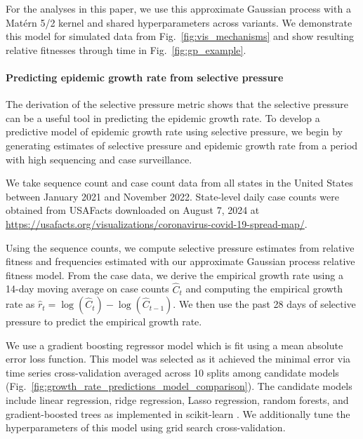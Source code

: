 \documentclass[11pt,oneside,letterpaper]{article}
\begin{document}
For the analyses in this paper, we use this approximate Gaussian process with a Mat\'ern 5/2 kernel and shared hyperparameters across variants.
We demonstrate this model for simulated data from Fig.~\ref{fig:vis_mechanisms} and show resulting relative fitnesses through time in Fig.~\ref{fig:gp_example}.

\paragraph{Predicting epidemic growth rate from selective pressure}

The derivation of the selective pressure metric shows that the selective pressure can be a useful tool in predicting the epidemic growth rate.
To develop a predictive model of epidemic growth rate using selective pressure, we begin by generating estimates of selective pressure and epidemic growth rate from a period with high sequencing and case surveillance.

We take sequence count and case count data from all states in the United States between January 2021 and November 2022.
State-level daily case counts were obtained from USAFacts downloaded on August 7, 2024 at \href{https://usafacts.org/visualizations/coronavirus-covid-19-spread-map/}{https://usafacts.org/visualizations/coronavirus-covid-19-spread-map/}.

Using the sequence counts, we compute selective pressure estimates from relative fitness and frequencies estimated with our approximate Gaussian process relative fitness model.
From the case data, we derive the empirical growth rate using a 14-day moving average on case counts $\hat{C}_{t}$ and computing the empirical growth rate as $\hat{r}_{t} = \log(\hat{C}_{t}) - \log(\hat{C}_{t-1})$.
We then use the past 28 days of selective pressure to predict the empirical growth rate.

We use a gradient boosting regressor model which is fit using a mean absolute error loss function.
This model was selected as it achieved the minimal error via time series cross-validation averaged across 10 splits among candidate models (Fig.~\ref{fig:growth_rate_predictions_model_comparison}).
The candidate models include linear regression, ridge regression, Lasso regression, random forests, and gradient-boosted trees as implemented in scikit-learn \cite{scikit-learn}.
We additionally tune the hyperparameters of this model using grid search cross-validation.
\end{document}
